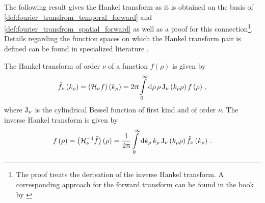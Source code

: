 The following result gives the Hankel transform as it is obtained on the
basis of \cref{def:fourier_transfrom_temporal_forward} and
\cref{def:fourier_transfrom_spatial_forward} as well as a proof for this
connection\footnote{The proof treats the derivation of the inverse Hankel
transform. A corresponding approach for the forward transform can be found
in the book by \textcite[pp.~229]{Davies2002}}.
Details regarding the function spaces on which the Hankel transform pair is
defined can be found in specialized literature \cite{Patra2018,Davies2002}.

\begin{corollary}
	\label{coll:hankel_transform}
	The Hankel transform of order $\nu$ of a function $f\left(\rho\right)$ is
	given by
	\begin{equation}\label{eq:hankel_transform}
		\tilde{f}_\nu \left(k_\rho\right) =
		\left( \mathcal{H}_{\nu} f \right) \left(k_\rho\right) = 
		2\uppi
		\int\limits_{0}^{\infty} \mathrm{d} \rho \, \rho
		\operatorname{J}_{\nu}\left(k_\rho \rho\right)
		f\left(\rho\right) \, ,
	\end{equation}
	where $\operatorname{J}_{\nu}$ is the cylindrical Bessel function of first kind and
	of order $\nu$.
	The inverse Hankel transform is given by
	\begin{equation}\label{eq:hankel_transform_inverse}
		f\left(\rho\right) =
		\left( \mathcal{H}^{-1}_{\nu}\tilde{f}\right) \left(\rho\right) =
		\frac{1}{2\uppi}
		\int\limits_{0}^{\infty} \mathrm{d} k_\rho \, k_\rho
		\operatorname{J}_{\nu}\left(k_\rho \rho\right)
		\tilde{f}_\nu\left(k_\rho\right) \, .
	\end{equation}
\end{corollary}
